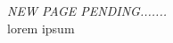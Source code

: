 \documentclass[12pt]{article}
\newcommand{\customtext}[3]{%
    \vspace{#2} %
    \fontsize{13}{8}\textcolor{#1}{\textit{#3}}%
}
\begin{document}
\pagebreak
\begin{figure}[!htb]
    \begin{minipage}[t]{0.65\textwidth}
    \raggedright
    \customtext{xtitle}{0em}{NEW PAGE PENDING.......}\\
lorem ipsum
\end{minipage}%
\hspace{25pt}
\begin{minipage}[t]{.4\textwidth}
  \raggedright
  \scriptsize 
\end{minipage}
\end{figure}
\end{document}
